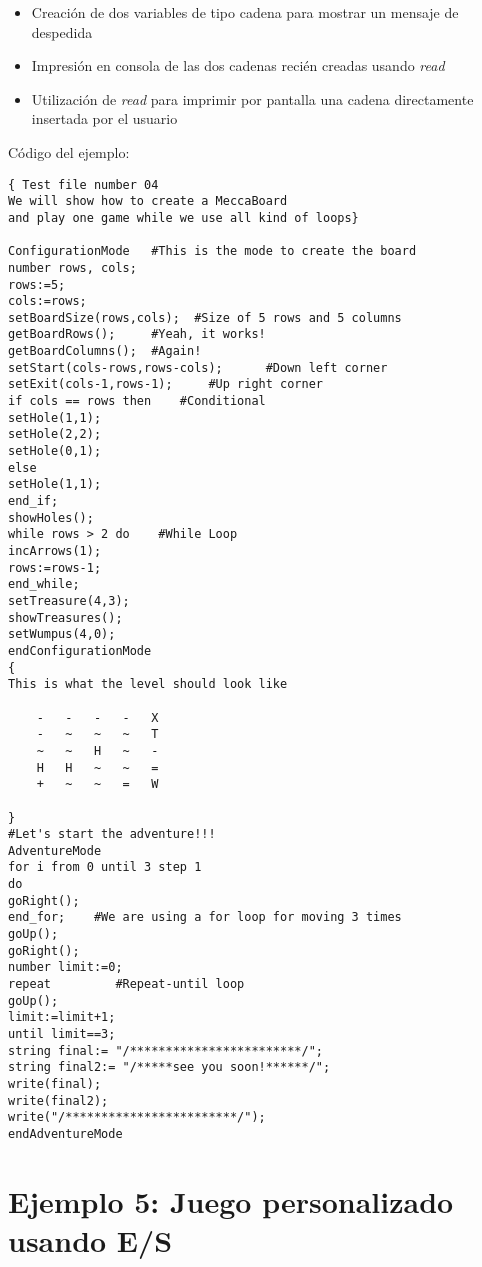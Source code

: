 \documentclass[a4paper,12pt,twoside,openright]{report}
\begin{document}
\begin{itemize}
\begin{itemize}
      \begin{itemize}
      \item Llegada de Mecca a la casilla del tesoro
      \item Llegada de Mecca a la casilla de salida
      \end{itemize}
      \item Creación de dos variables de tipo cadena para mostrar un mensaje de despedida
      \item Impresión en consola de las dos cadenas recién creadas usando \emph{read}
      \item Utilización de \emph{read} para imprimir por pantalla una cadena directamente insertada por el usuario
      \end{itemize}
   \end{itemize}
  
  Código del ejemplo:
  \begin{lstlisting}
{ Test file number 04
We will show how to create a MeccaBoard 
and play one game while we use all kind of loops}

ConfigurationMode   #This is the mode to create the board
number rows, cols;
rows:=5;
cols:=rows;
setBoardSize(rows,cols);  #Size of 5 rows and 5 columns
getBoardRows();     #Yeah, it works!
getBoardColumns();  #Again!
setStart(cols-rows,rows-cols);      #Down left corner
setExit(cols-1,rows-1);	    #Up right corner
if cols == rows then    #Conditional
setHole(1,1);	    
setHole(2,2);
setHole(0,1);
else
setHole(1,1);
end_if;
showHoles();
while rows > 2 do    #While Loop
incArrows(1);
rows:=rows-1;
end_while;
setTreasure(4,3);
showTreasures();
setWumpus(4,0);
endConfigurationMode
{
This is what the level should look like

	-	-	-	-	X
	-	~	~	~	T
	~	~	H	~	-
	H	H	~	~	=
	+	~	~	=	W

}
#Let's start the adventure!!!
AdventureMode
for i from 0 until 3 step 1
do
goRight();
end_for;	#We are using a for loop for moving 3 times
goUp();		
goRight();
number limit:=0;
repeat         #Repeat-until loop
goUp();
limit:=limit+1;
until limit==3;
string final:= "/************************/";
string final2:= "/*****see you soon!******/";
write(final);
write(final2);
write("/************************/");
endAdventureMode
  \end{lstlisting}

  \section{Ejemplo 5: Juego personalizado usando E/S}
  
\end{document}
